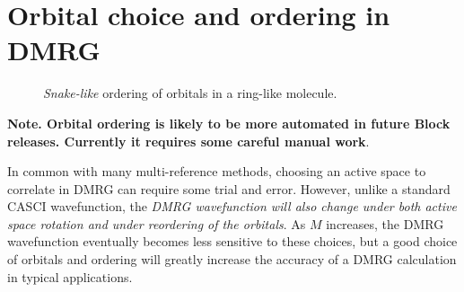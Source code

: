 \documentclass[letterpaper,12pt,aps, pra]{revtex4-1}
\begin{document}
\section{Orbital choice and ordering in DMRG}\label{sec:appendix2}
\begin{figure}
 \begin{center}
 \end{center}
 \caption{\emph{Snake-like} ordering of orbitals in a ring-like molecule.}
 \label{fig:order}
 \end{figure}

{\bf Note. Orbital ordering is likely to be more automated in future Block releases. Currently it requires some careful manual work}.

In common with many multi-reference methods, choosing an active space to correlate in DMRG can
require some trial and error. However, unlike a standard CASCI wavefunction, the {\it DMRG wavefunction will also  change under both active space rotation and under reordering of the orbitals}.
As $M$ increases, the DMRG wavefunction eventually becomes less sensitive to these choices, but
a good choice of orbitals and ordering will greatly increase the accuracy of a DMRG calculation in typical applications. 
\end{document}
